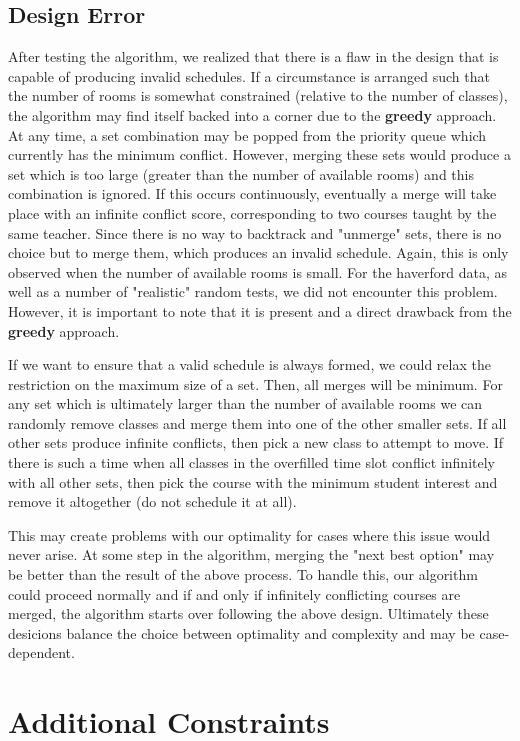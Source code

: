 \documentclass[11pt, oneside]{article}   	%
\begin{document}
\subsection{Design Error}
After testing the algorithm, we realized that there is a flaw in the design that is capable of producing invalid schedules. If a circumstance is arranged such that the number of rooms is somewhat constrained (relative to the number of classes), the algorithm may find itself backed into a corner due to the \textbf {greedy} approach. At any time, a set combination may be popped from the priority queue which currently has the minimum conflict. However, merging these sets would produce a set which is too large (greater than the number of available rooms) and this combination is ignored. If this occurs continuously, eventually a merge will take place with an infinite conflict score, corresponding to two courses taught by the same teacher. Since there is no way to backtrack and "unmerge" sets, there is no choice but to merge them, which produces an invalid schedule. Again, this is only observed when the number of available rooms is small. For the haverford data, as well as a number of "realistic" random tests, we did not encounter this problem. However, it is important to note that it is present and a direct drawback from the \textbf {greedy} approach.

If we want to ensure that a valid schedule is always formed, we could relax the restriction on the maximum size of a set. Then, all merges will be minimum. For any set which is ultimately larger than the number of available rooms we can randomly remove classes and merge them into one of the other smaller sets. If all other sets produce infinite conflicts, then pick a new class to attempt to move. If there is such a time when all classes in the overfilled time slot conflict infinitely with all other sets, then pick the course with the minimum student interest and remove it altogether (do not schedule it at all).

This may create problems with our optimality for cases where this issue would never arise. At some step in the algorithm, merging the "next best option" may be better than the result of the above process. To handle this, our algorithm could proceed normally and if and only if infinitely conflicting courses are merged, the algorithm starts over following the above design. Ultimately these desicions balance the choice between optimality and complexity and may be case-dependent. 

\section{Additional Constraints}
\end{document}
